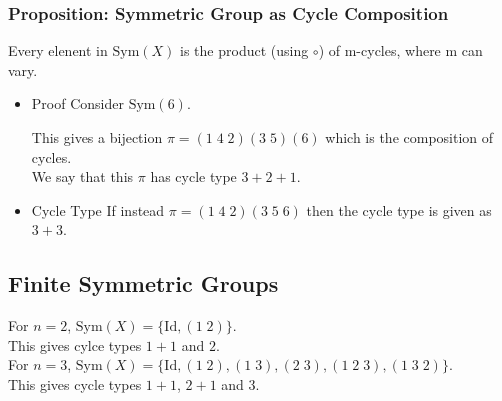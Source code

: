 \documentclass[11pt]{article}
\newcommand{\0}{\emptyset}
\begin{document}
\subsubsection*{Proposition: Symmetric Group as Cycle Composition}
\label{sec:org6a42ec9}
Every elenent in \(\text{Sym}(X)\) is the product (using \(\circ\)) of m-cycles, where m can vary.\\[0pt]
\begin{itemize}
\item Proof
\label{sec:org2be0a2d}
Consider \(\text{Sym}(6)\).\\[0pt]
This gives a bijection \(\pi = (1\;4\;2)(3\;5)(6)\) which is the composition of cycles.\\[0pt]
We say that this \(\pi\) has cycle type \(3+2+1\).\\[0pt]
\item Cycle Type
\label{sec:org311dca7}
If instead \(\pi=(1\;4\;2)(3\;5\;6)\) then the cycle type is given as \(3+3\).\\[0pt]
\end{itemize}
\subsection*{Finite Symmetric Groups}
\label{sec:org7c6d886}
For \(n=2\), \(\text{Sym}(X)=\{\text{Id},(1\;2)\}\).\\[0pt]
This gives cylce types \(1+1\) and \(2\).\\[0pt]
For \(n=3\), \(\text{Sym}(X)=\{\text{Id},(1\;2),(1\;3),(2\;3),(1\;2\;3),(1\;3\;2)\}\).\\[0pt]
This gives cycle types \(1+1\), \(2+1\) and \(3\).\\[0pt]
\end{document}
